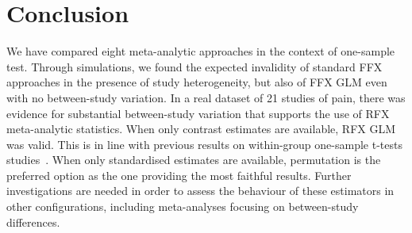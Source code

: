 \documentclass{llncs}
\begin{document}



    

\section{Conclusion}\label{sec_ccl}
We have compared eight meta-analytic approaches in the context of one-sample test. Through simulations, we found the expected invalidity of standard FFX approaches in the presence of study heterogeneity, but also of FFX GLM even with no between-study variation. In a real dataset of 21 studies of pain, there was evidence for substantial between-study variation that supports the use of RFX meta-analytic statistics. When only contrast estimates are available, RFX GLM was valid. This is in line with previous results on within-group one-sample t-tests studies~\cite{Mumford2009}. When only standardised estimates are available, permutation is the preferred option as the one providing the most faithful results. Further investigations are needed in order to assess the behaviour of these estimators in other configurations, including meta-analyses focusing on between-study differences.
\end{document}
